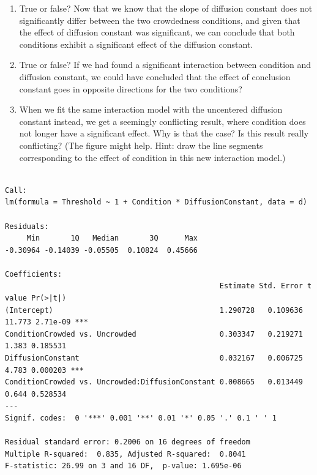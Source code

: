 \documentclass[
]{article}
\providecommand{\tightlist}{%
  \setlength{\itemsep}{0pt}\setlength{\parskip}{0pt}}
\begin{document}
\begin{enumerate}
\def\labelenumi{\arabic{enumi}.}
\setcounter{enumi}{5}
\tightlist
\item
  True or false? Now that we know that the slope of diffusion constant
  does not significantly differ between the two crowdedness conditions,
  and given that the effect of diffusion constant was significant, we
  can conclude that both conditions exhibit a significant effect of the
  diffusion constant.
\item
  True or false? If we had found a significant interaction between
  condition and diffusion constant, we could have concluded that the
  effect of conclusion constant goes in opposite directions for the two
  conditions?
\item
  When we fit the same interaction model with the uncentered diffusion
  constant instead, we get a seemingly conflicting result, where
  condition does not longer have a significant effect. Why is that the
  case? Is this result really conflicting? (The figure might help. Hint:
  draw the line segments corresponding to the effect of condition in
  this new interaction model.)
\end{enumerate}

\footnotesize

\begin{verbatim}

Call:
lm(formula = Threshold ~ 1 + Condition * DiffusionConstant, data = d)

Residuals:
     Min       1Q   Median       3Q      Max 
-0.30964 -0.14039 -0.05505  0.10824  0.45666 

Coefficients:
                                                 Estimate Std. Error t value Pr(>|t|)    
(Intercept)                                      1.290728   0.109636  11.773 2.71e-09 ***
ConditionCrowded vs. Uncrowded                   0.303347   0.219271   1.383 0.185531    
DiffusionConstant                                0.032167   0.006725   4.783 0.000203 ***
ConditionCrowded vs. Uncrowded:DiffusionConstant 0.008665   0.013449   0.644 0.528534    
---
Signif. codes:  0 '***' 0.001 '**' 0.01 '*' 0.05 '.' 0.1 ' ' 1

Residual standard error: 0.2006 on 16 degrees of freedom
Multiple R-squared:  0.835, Adjusted R-squared:  0.8041 
F-statistic: 26.99 on 3 and 16 DF,  p-value: 1.695e-06
\end{verbatim}
\end{document}
